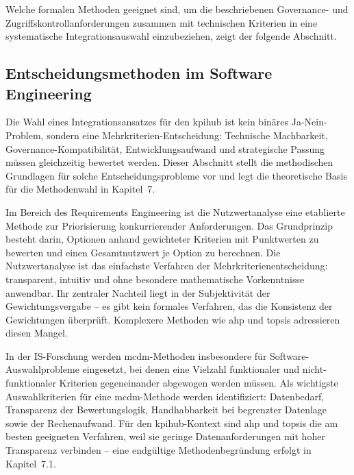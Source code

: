 Welche formalen Methoden geeignet sind, um die beschriebenen Governance- und Zugriffskontrollanforderungen zusammen mit technischen Kriterien in eine systematische Integrationsauswahl einzubeziehen, zeigt der folgende Abschnitt.


\subsection{Entscheidungsmethoden im Software Engineering}
\label{sec:grundlagen-mcdm}

Die Wahl eines Integrationsansatzes für den \gls{kpihub} ist kein binäres Ja-Nein-Problem, sondern eine Mehr\-kri\-te\-rien-Entscheidung: Technische Machbarkeit, Gover\-nance-Kompa\-ti\-bi\-li\-tät, Entwicklungsaufwand und strategische Passung müssen gleichzeitig bewertet werden.
Dieser Abschnitt stellt die methodischen Grundlagen für solche Entscheidungsprobleme vor und legt die theoretische Basis für die Methodenwahl in Kapitel~7.

Im Bereich des Requirements Engineering ist die Nutzwertanalyse eine etablierte Methode zur Priorisierung konkurrierender Anforderungen.
Das Grundprinzip besteht darin, Optionen anhand gewichteter Kriterien mit Punktwerten zu bewerten und einen Gesamtnutzwert je Option zu berechnen.
Die Nutzwertanalyse ist das einfachste Verfahren der Mehrkriterienentscheidung: transparent, intuitiv und ohne besondere mathematische Vorkenntnisse anwendbar.
Ihr zentraler Nachteil liegt in der Subjektivität der Gewichtungsvergabe -- es gibt kein formales Verfahren, das die Konsistenz der Gewichtungen überprüft.
Komplexere Methoden wie \gls{ahp} und \gls{topsis} adressieren diesen Mangel.

In der IS-Forschung werden \gls{mcdm}-Methoden insbesondere für Software-Auswahlprobleme eingesetzt, bei denen eine Vielzahl funktionaler und nicht-funktionaler Kriterien gegeneinander abgewogen werden müssen.
Als wichtigste Auswahlkriterien für eine \gls{mcdm}-Methode werden identifiziert: Datenbedarf, Transparenz der Bewertungslogik, Handhabbarkeit bei begrenzter Datenlage sowie der Rechenaufwand.
Für den \gls{kpihub}-Kontext sind \gls{ahp} und \gls{topsis} die am besten geeigneten Verfahren, weil sie geringe Datenanforderungen mit hoher Transparenz verbinden -- eine endgültige Methodenbegründung erfolgt in Kapitel~7.1.

